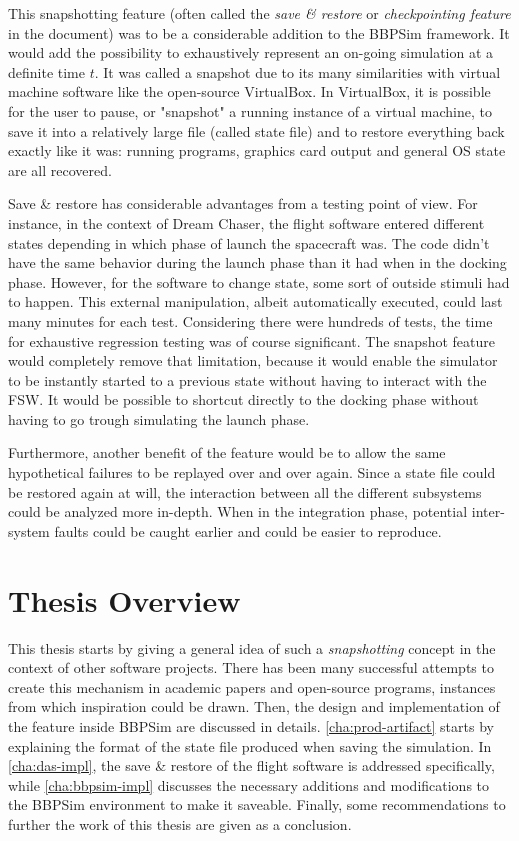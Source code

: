 This snapshotting feature (often called the \textit{save \& restore} or \textit{checkpointing feature} in the document) was to be a considerable addition to the \gls{BBPSim} framework. It would add the possibility to exhaustively represent an on-going simulation at a definite time $t$. It was called a snapshot due to its many similarities with virtual machine software like the open-source VirtualBox. In VirtualBox, it is possible for the user to pause, or "snapshot" a running instance of a virtual machine, to save it into a relatively large file (called state file) and to restore everything back exactly like it was: running programs, graphics card output and general OS state are all recovered.  

Save \& restore has considerable advantages from a testing point of view. For instance, in the context of Dream Chaser, the flight software entered different states depending in which phase of launch the spacecraft was. The code didn't have the same behavior during the launch phase than it had when in the docking phase. However, for the software to change state, some sort of outside stimuli had to happen. This external manipulation, albeit automatically executed, could last many minutes for each test. Considering there were hundreds of tests, the time for exhaustive regression testing was of course significant. The snapshot feature would completely remove that limitation, because it would enable the simulator to be instantly started to a previous state without having to interact with the \gls{FSW}. It would be possible to shortcut directly to the docking phase without having to go trough simulating the launch phase. 

Furthermore, another benefit of the feature would be to allow the same hypothetical failures to be replayed over and over again. Since a state file could be restored again at will, the interaction between all the different subsystems could be analyzed more in-depth. When in the integration phase, potential inter-system faults could be caught earlier and could be easier to reproduce.  

\section{Thesis Overview}
This thesis starts by giving a general idea of such a \textit{snapshotting} concept in the context of other software projects. There has been many successful attempts to create this mechanism in academic papers and open-source programs, instances from which inspiration could be drawn. Then, the design and implementation of the feature inside \gls{BBPSim} are discussed in details. \autoref{cha:prod-artifact} starts by explaining the format of the state file produced when saving the simulation. In \autoref{cha:das-impl}, the save \& restore of the flight software is addressed specifically, while \autoref{cha:bbpsim-impl} discusses the necessary additions and modifications to the BBPSim environment to make it saveable. Finally, some recommendations to further the work of this thesis are given as a conclusion.
